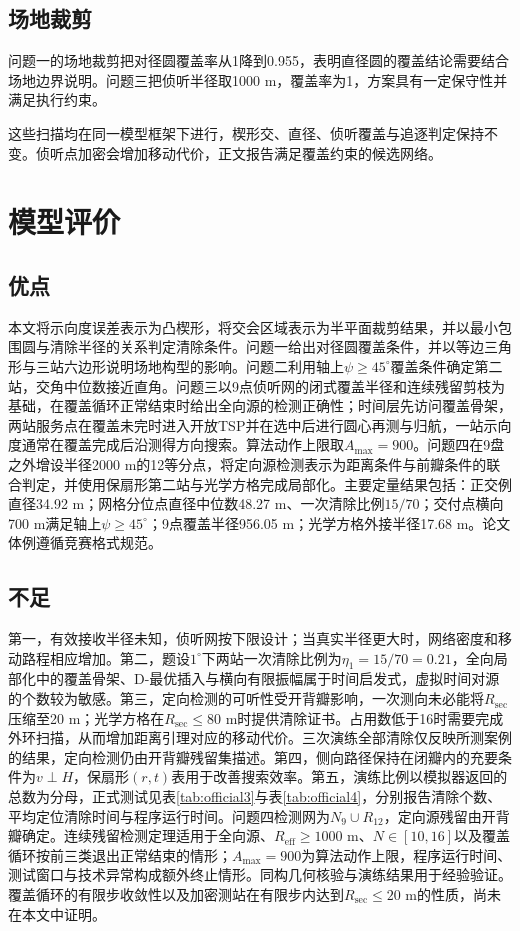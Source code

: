 \documentclass{cumcmthesis}
\begin{document}
\subsection{场地裁剪}

问题一的场地裁剪把对径圆覆盖率从1降到0.955，表明直径圆的覆盖结论需要结合场地边界说明。问题三把侦听半径取1000 m，覆盖率为1，方案具有一定保守性并满足执行约束。

这些扫描均在同一模型框架下进行，楔形交、直径、侦听覆盖与追逐判定保持不变。侦听点加密会增加移动代价，正文报告满足覆盖约束的候选网络。

\section{模型评价}

\subsection{优点}

本文将示向度误差表示为凸楔形，将交会区域表示为半平面裁剪结果，并以最小包围圆与清除半径的关系判定清除条件。问题一给出对径圆覆盖条件，并以等边三角形与三站六边形说明场地构型的影响。问题二利用轴上$\psi\ge 45^\circ$覆盖条件确定第二站，交角中位数接近直角。问题三以9点侦听网的闭式覆盖半径和连续残留剪枝为基础，在覆盖循环正常结束时给出全向源的检测正确性；时间层先访问覆盖骨架，两站服务点在覆盖未完时进入开放TSP并在选中后进行圆心再测与归航，一站示向度通常在覆盖完成后沿测得方向搜索。算法动作上限取$A_{\max}=900$。问题四在9盘之外增设半径2000 m的12等分点，将定向源检测表示为距离条件与前瓣条件的联合判定，并使用保扇形第二站与光学方格完成局部化。主要定量结果包括：正交例直径34.92 m；网格分位点直径中位数48.27 m、一次清除比例$15/70$；交付点横向700 m满足轴上$\psi\ge 45^\circ$；9点覆盖半径956.05 m；光学方格外接半径17.68 m。论文体例遵循竞赛格式规范\cite{format}。

\subsection{不足}

第一，有效接收半径未知，侦听网按下限设计；当真实半径更大时，网络密度和移动路程相应增加。第二，题设$1^\circ$下两站一次清除比例为$\eta_1=15/70=0.21$，全向局部化中的覆盖骨架、D-最优插入与横向有限振幅属于时间启发式，虚拟时间对源的个数较为敏感。第三，定向检测的可听性受开背瓣影响，一次测向未必能将$R_{\mathrm{sec}}$压缩至20 m；光学方格在$R_{\mathrm{sec}}\le 80$ m时提供清除证书。占用数低于16时需要完成外环扫描，从而增加距离引理对应的移动代价。三次演练全部清除仅反映所测案例的结果，定向检测仍由开背瓣残留集描述。第四，侧向路径保持在闭瓣内的充要条件为$v\perp H$，保扇形$(r,t)$表用于改善搜索效率。第五，演练比例以模拟器返回的总数为分母，正式测试见表\ref{tab:official3}与表\ref{tab:official4}，分别报告清除个数、平均定位清除时间与程序运行时间。问题四检测网为$N_9\cup R_{12}$，定向源残留由开背瓣确定。连续残留检测定理适用于全向源、$R_{\mathrm{eff}}\ge 1000$ m、$N\in[10,16]$以及覆盖循环按前三类退出正常结束的情形；$A_{\max}=900$为算法动作上限，程序运行时间、测试窗口与技术异常构成额外终止情形。同构几何核验与演练结果用于经验验证。覆盖循环的有限步收敛性以及加密测站在有限步内达到$R_{\mathrm{sec}}\le 20$ m的性质，尚未在本文中证明。
\end{document}
